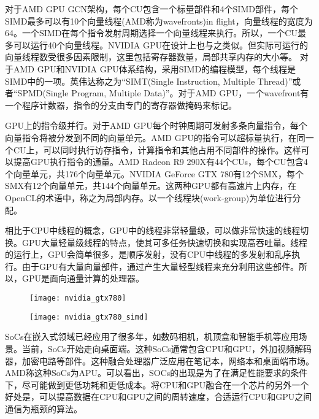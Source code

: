 对于AMD GPU GCN架构，每个CU包含一个标量部件和4个SIMD部件，每个SIMD最多可以有10个向量线程(AMD称为wavefronts)in flight，向量线程的宽度为64。一个SIMD在每个指令发射周期选择一个向量线程来执行。所以，一个CU最多可以运行40个向量线程。NVIDIA GPU在设计上也与之类似。但实际可运行的向量线程数受很多因素限制，这里包括寄存器数量，局部共享内存的大小等。
对于AMD GPU和NVIDIA GPU体系结构，采用SIMD的编程模型，每个线程是SIMD中的一项。英伟达称之为“SIMT(Single Instruction, Multiple Thread)”或者“SPMD(Single Program, Multiple Data)”。对于AMD GPU，一个wavefront有一个程序计数器，指令的分支由专门的寄存器做掩码来标记。

GPU上的指令级并行。对于AMD GPU每个时钟周期可发射多条向量指令，每个向量指令将被分发到不同的向量单元。AMD GPU的指令可以超标量执行，在同一个CU上，可以同时执行访存指令，计算指令和其他占用不同部件的操作。这样可以提高GPU执行指令的通量。AMD Radeon R9 290X有44个CUs，每个CU包含4个向量单元，共176个向量单元。NVIDIA GeForce GTX 780有12个SMX，每个SMX有12个向量单元，共144个向量单元。这两种GPU都有高速片上内存，在OpenCL的术语中，称之为局部内存。以一个线程块(work-group)为单位进行分配。

相比于CPU中线程的概念，GPU中的线程非常轻量级，可以做非常快速的线程切换。GPU大量轻量级线程的特点，使其可多任务快速切换和实现高吞吐量。线程的运行上，GPU会简单很多，是顺序发射，没有CPU中线程的多发射和乱序执行。由于GPU有大量向量部件，通过产生大量轻型线程来充分利用这些部件。所以，GPU是面向通量计算的处理器。
\begin{figure}[htbp]
	\centering
	\texttt{[image: nvidia\_gtx780]}
	\label{fig:nvidia_gtx780}
\end{figure}

\begin{figure}[htbp]
	\centering
	\texttt{[image: nvidia\_gtx780\_simd]}
	\label{fig:nvidia_gtx780_simd}
\end{figure}

SoCs在嵌入式领域已经应用了很多年，如数码相机，机顶盒和智能手机等应用场景。当前，SoCs开始走向桌面端。这种SoCs通常包含CPU和GPU，外加视频解码器，加密电路等部件。这种融合处理器广泛应用在笔记本，网络本和桌面端市场。AMD称这种SoCs为APU。可以看出，SOCs的出现是为了在满足性能要求的条件下，尽可能做到更低功耗和更低成本。将CPU和GPU融合在一个芯片的另外一个好处是，可以提高数据在CPU和GPU之间的周转速度，合适运行CPU和GPU之间通信为瓶颈的算法。


